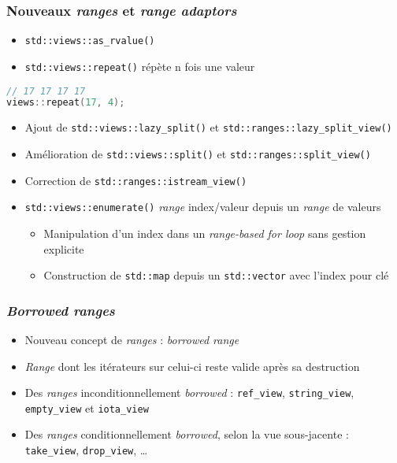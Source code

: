 \documentclass[C++.tex]{subfiles}
\begin{document}
\begin{frame}[fragile]
	\frametitle{Nouveaux \textit{ranges} et \textit{range adaptors}}
	\begin{itemize}
		\item \lstinline|std::views::as_rvalue()|
		\item \lstinline|std::views::repeat()| répète n fois une valeur
	\end{itemize}

	\begin{lstlisting}[language=C++]
// 17 17 17 17
views::repeat(17, 4);\end{lstlisting}

	\begin{itemize}
		\item Ajout de \lstinline|std::views::lazy_split()| et \lstinline|std::ranges::lazy_split_view()|
		\item Amélioration de \lstinline|std::views::split()| et \lstinline|std::ranges::split_view()|
		\item Correction de \lstinline|std::ranges::istream_view()|
		\item \lstinline|std::views::enumerate()| \textit{range} index/valeur depuis un \textit{range} de valeurs
		\begin{itemize}
			\item Manipulation d'un index dans un \textit{range-based for loop} sans gestion explicite
			\item Construction de \lstinline|std::map| depuis un \lstinline|std::vector| avec l'index pour clé
		\end{itemize}
	\end{itemize}
\end{frame}

\begin{frame}[fragile]
	\frametitle{\textit{Borrowed ranges}}
	\begin{itemize}
		\item Nouveau concept de \textit{ranges} : \textit{borrowed range}
		\item \textit{Range} dont les itérateurs sur celui-ci reste valide après sa destruction
		\item Des \textit{ranges} inconditionnellement \textit{borrowed} : \lstinline|ref_view|, \lstinline|string_view|, \lstinline|empty_view| et \lstinline|iota_view|
		\item Des \textit{ranges} conditionnellement \textit{borrowed}, selon la vue sous-jacente : \lstinline|take_view|, \lstinline|drop_view|, \ldots
	\end{itemize}
\end{frame}
\end{document}

